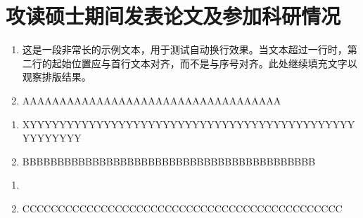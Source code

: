 \documentclass[../article.tex]{subfiles} %
\begin{document}
\clearpage
{} %
\section*{攻读硕士期间发表论文及参加科研情况}
\newline
{}

\begin{enumerate}[label=\arabic*.,leftmargin=1.5em]
    \item 这是一段非常长的示例文本，用于测试自动换行效果。当文本超过一行时，第二行的起始位置应与首行文本对齐，而不是与序号对齐。此处继续填充文字以观察排版结果。
    \item AAAAAAAAAAAAAAAAAAAAAAAAAAAAAAAAAAA
\end{enumerate}



\begin{enumerate}[label=\arabic*.,leftmargin=1.5em]
    \item XYYYYYYYYYYY\-YYYYYYYYYYYYYYY\-YYYYYYYYYYYYYYYYYYYYYYY\-YYY
    \item BBBBBBBBBBBBBBBBBBBBBBBBBBBBBBBBBBBBBBBBBB
\end{enumerate}


\begin{enumerate}[label=\arabic*.,leftmargin=1.5em]
    \item {}
    \item CCCCCCCCCCCCCCCCCCCCCCCCCCCCCCCCCCCCCCCCCCCCC
\end{enumerate}
\end{document}
